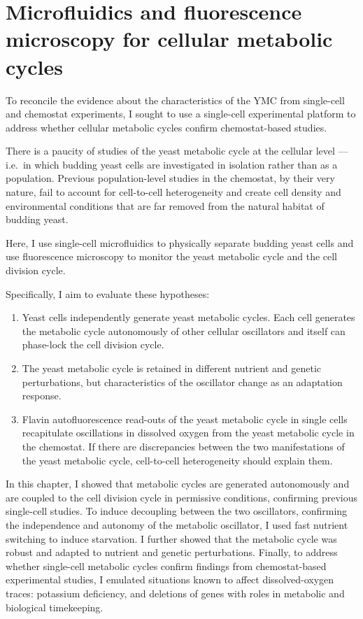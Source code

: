 \chapter{Microfluidics and fluorescence microscopy for cellular metabolic cycles}
\label{ch:biology}

To reconcile the evidence about the characteristics of the YMC from single-cell and chemostat experiments, I sought to use a single-cell experimental platform to address whether cellular metabolic cycles confirm chemostat-based studies.

There is a paucity of studies of the yeast metabolic cycle at the cellular level --- i.e.\ in which budding yeast cells are investigated in isolation rather than as a population.
Previous population-level studies in the chemostat, by their very nature, fail to account for cell-to-cell heterogeneity and create cell density and environmental conditions that are far removed from the natural habitat of budding yeast.

Here, I use single-cell microfluidics to physically separate budding yeast cells and use fluorescence microscopy to monitor the yeast metabolic cycle and the cell division cycle.

Specifically, I aim to evaluate these hypotheses:
\begin{enumerate}
  \item Yeast cells independently generate yeast metabolic cycles.
        Each cell generates the metabolic cycle autonomously of other cellular oscillators and itself can phase-lock the cell division cycle.
  \item The yeast metabolic cycle is retained in different nutrient and genetic perturbations, but characteristics of the oscillator change as an adaptation response.
  \item Flavin autofluorescence read-outs of the yeast metabolic cycle in single cells recapitulate oscillations in dissolved oxygen from the yeast metabolic cycle in the chemostat.
        If there are discrepancies between the two manifestations of the yeast metabolic cycle, cell-to-cell heterogeneity should explain them.
\end{enumerate}

In this chapter, I showed that metabolic cycles are generated autonomously and are coupled to the cell division cycle in permissive conditions, confirming previous single-cell studies.
To induce decoupling between the two oscillators, confirming the independence and autonomy of the metabolic oscillator, I used fast nutrient switching to induce starvation.
I further showed that the metabolic cycle was robust and adapted to nutrient and genetic perturbations.
Finally, to address whether single-cell metabolic cycles confirm findings from chemostat-based experimental studies, I emulated situations known to affect dissolved-oxygen traces: potassium deficiency, and deletions of genes with roles in metabolic and biological timekeeping.


